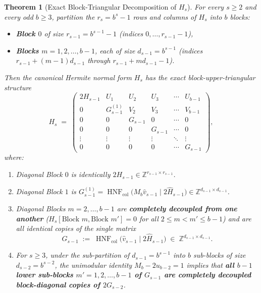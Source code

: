 \documentclass[11pt,a4paper]{article}
\theoremstyle{plain}
\newtheorem{theorem}{Theorem}[section]
\theoremstyle{definition}
\newcommand{\Z}{\mathbb{Z}}
\newcommand{\HNF}{\operatorname{HNF}}
\newcommand{\col}{\operatorname{col}}
\begin{document}
\begin{theorem}[Exact Block-Triangular Decomposition of $H_s$]\label{thm:T2}
For every $s \ge 2$ and every odd $b \ge 3$, partition the $r_s = b^s - 1$ rows and columns of $H_s$ into $b$ blocks:
\begin{itemize}[nosep]
\item \textbf{Block $0$} of size $r_{s-1} = b^{s-1} - 1$ (indices $0, \dots, r_{s-1}-1$),
\item \textbf{Blocks $m = 1, 2, \dots, b-1$}, each of size $d_{s-1} = b^{s-1}$ (indices $r_{s-1} + (m-1)d_{s-1}$ through $r_{s-1} + m d_{s-1} - 1$).
\end{itemize}
Then the canonical Hermite normal form $H_s$ has the exact block-upper-triangular structure
\begin{equation}\label{eq:H_s-blocks}
H_s \;=\; \begin{pmatrix}
2 H_{s-1} & U_1 & U_2 & U_3 & \cdots & U_{b-1} \\
0 & G_{s-1}^{(1)} & V_2 & V_3 & \cdots & V_{b-1} \\
0 & 0 & G_{s-1} & 0 & \cdots & 0 \\
0 & 0 & 0 & G_{s-1} & \cdots & 0 \\
\vdots & \vdots & \vdots & \vdots & \ddots & \vdots \\
0 & 0 & 0 & 0 & \cdots & G_{s-1}
\end{pmatrix},
\end{equation}
where:
\begin{enumerate}[label=(\alph*)]
\item Diagonal Block $0$ is identically $2 H_{s-1} \in \Z^{r_{s-1} \times r_{s-1}}$.
\item Diagonal Block $1$ is $G_{s-1}^{(1)} = \HNF_{\col}\big(M_b \hat{v}_{s-1} \;\big|\; 2 \hat{H}_{s-1}\big) \in \Z^{d_{s-1} \times d_{s-1}}$.
\item Diagonal Blocks $m = 2, \dots, b-1$ are \textbf{completely decoupled from one another} ($H_s[\text{Block } m, \text{Block } m'] = 0$ for all $2 \le m < m' \le b-1$) and are all identical copies of the single matrix
\begin{equation}\label{eq:G_s-1}
G_{s-1} \;:=\; \HNF_{\col}\big(\hat{v}_{s-1} \;\big|\; 2 \hat{H}_{s-1}\big) \;\in\; \Z^{d_{s-1} \times d_{s-1}}.
\end{equation}
\item For $s \ge 3$, under the sub-partition of $d_{s-1} = b^{s-1}$ into $b$ sub-blocks of size $d_{s-2} = b^{s-2}$, the unimodular identity $M_b - 2 u_{b-2} = 1$ implies that \textbf{all $b-1$ lower sub-blocks $m' = 1, 2, \dots, b-1$ of $G_{s-1}$ are completely decoupled block-diagonal copies of $2 G_{s-2}$}.
\end{enumerate}
\end{theorem}
\end{document}
